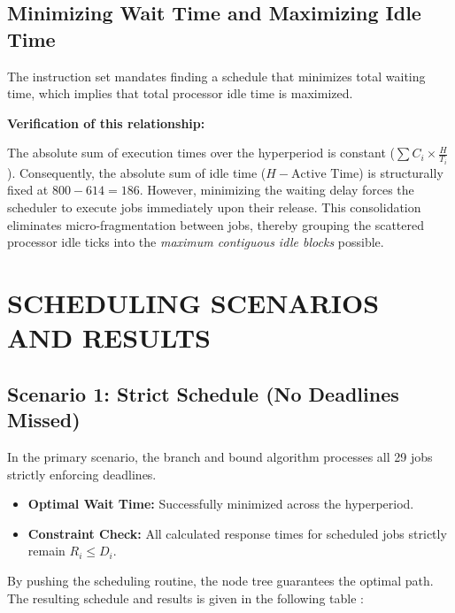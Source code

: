 \documentclass{report}
\begin{document}
\section{Minimizing Wait Time and Maximizing Idle Time}

The instruction set mandates finding a schedule that minimizes total waiting time, which implies that total processor idle time is maximized. 

\textbf{Verification of this relationship:}

The absolute sum of execution times over the hyperperiod is constant ($\sum C_i \times \frac{H}{T_i}$). Consequently, the absolute sum of idle time ($H - \text{Active Time}$) is structurally fixed at $800 - 614 = 186$. However, minimizing the waiting delay forces the scheduler to execute jobs immediately upon their release. This consolidation eliminates micro-fragmentation between jobs, thereby grouping the scattered processor idle ticks into the \textit{maximum contiguous idle blocks} possible.

\chapter{SCHEDULING SCENARIOS AND RESULTS}

\section{Scenario 1: Strict Schedule (No Deadlines Missed)}

In the primary scenario, the branch and bound algorithm processes all 29 jobs strictly enforcing deadlines. 

\begin{itemize}
    \item \textbf{Optimal Wait Time:} Successfully minimized across the hyperperiod.
    \item \textbf{Constraint Check:} All calculated response times for scheduled jobs strictly remain $R_i \le D_i$. 
\end{itemize}

By pushing the scheduling routine, the node tree guarantees the optimal path. The resulting schedule and results is given in the following table : 
\end{document}
